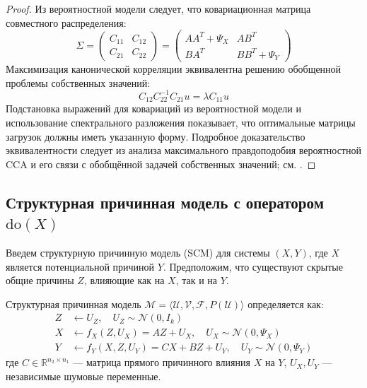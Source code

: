 \documentclass[a4paper,14pt]{article}
\theoremstyle{plain} %
\theoremstyle{definition} %
\theoremstyle{remark} %
\begin{document}
\begin{proof}
Из вероятностной модели следует, что ковариационная матрица совместного распределения:
\[
\Sigma = \begin{pmatrix}
C_{11} & C_{12} \\
C_{21} & C_{22}
\end{pmatrix} = \begin{pmatrix}
A A^T + \Psi_X & A B^T \\
B A^T & B B^T + \Psi_Y
\end{pmatrix}
\]
Максимизация канонической корреляции эквивалентна решению обобщенной проблемы собственных значений:
\[
C_{12}C_{22}^{-1}C_{21} u = \lambda C_{11} u
\]
Подстановка выражений для ковариаций из вероятностной модели и использование спектрального разложения показывает, что оптимальные матрицы загрузок должны иметь указанную форму. Подробное доказательство эквивалентности следует из анализа
максимального правдоподобия вероятностной CCA и его связи
с обобщённой задачей собственных значений; см. \cite{Bach2005API}.
\end{proof}

\subsection{Структурная причинная модель с оператором $\text{do}(X)$}

Введем структурную причинную модель (SCM) для системы $(X,Y)$, где $X$ является потенциальной причиной $Y$. Предположим, что существуют скрытые общие причины $Z$, влияющие как на $X$, так и на $Y$.

\begin{definition}
Структурная причинная модель $\mathcal{M} = \langle \mathcal{U}, \mathcal{V}, \mathcal{F}, P(\mathcal{U}) \rangle$ определяется как:
\begin{equation}
\begin{aligned}
Z &\leftarrow U_Z, \quad U_Z \sim \mathcal{N}(0, I_k) \\
X &\leftarrow f_X(Z, U_X) = A Z + U_X, \quad U_X \sim \mathcal{N}(0, \Psi_X) \\
Y &\leftarrow f_Y(X, Z, U_Y) = C X + B Z + U_Y, \quad U_Y \sim \mathcal{N}(0, \Psi_Y)
\end{aligned}
\end{equation}
где $C \in \mathbb{R}^{n_2 \times n_1}$ --- матрица прямого причинного влияния $X$ на $Y$, $U_X, U_Y$ --- независимые шумовые переменные.
\end{definition}
\end{document}
